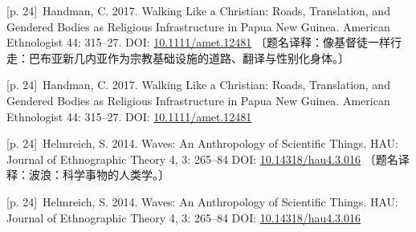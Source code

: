 \documentclass[10pt,a4paper]{article}
\begin{document}
\noindent\begin{minipage}{\textwidth}\begin{minipage}[t]{\dimexpr.5\textwidth-4mm\relax}\noindent\begin{minipage}[t]{\linewidth}{\scriptsize\color{gray} [p. 24]}\ Handman, C. 2017. Walking Like a Christian: Roads, Translation, and Gendered Bodies as Religious Infrastructure in Papua New Guinea. American Ethnologist 44: 315–27. DOI: \url{10.1111/amet.12481} 〔题名译释：像基督徒一样行走：巴布亚新几内亚作为宗教基础设施的道路、翻译与性别化身体。〕\par\end{minipage}\par\end{minipage}\hfill\begin{minipage}[t]{\dimexpr.5\textwidth-4mm\relax}\noindent\begin{minipage}[t]{\linewidth}{\scriptsize\color{gray} [p. 24]}\ Handman, C. 2017. Walking Like a Christian: Roads, Translation, and Gendered Bodies as Religious Infrastructure in Papua New Guinea. American Ethnologist 44: 315–27. DOI: \url{10.1111/amet.12481}\par\end{minipage}\par\end{minipage}\end{minipage}\par
\noindent\begin{minipage}{\textwidth}\begin{minipage}[t]{\dimexpr.5\textwidth-4mm\relax}\noindent\begin{minipage}[t]{\linewidth}{\scriptsize\color{gray} [p. 24]}\ Helmreich, S. 2014. Waves: An Anthropology of Scientific Things. HAU: Journal of Ethnographic Theory 4, 3: 265–84 DOI: \url{10.14318/hau4.3.016} 〔题名译释：波浪：科学事物的人类学。〕\par\end{minipage}\par\end{minipage}\hfill\begin{minipage}[t]{\dimexpr.5\textwidth-4mm\relax}\noindent\begin{minipage}[t]{\linewidth}{\scriptsize\color{gray} [p. 24]}\ Helmreich, S. 2014. Waves: An Anthropology of Scientific Things. HAU: Journal of Ethnographic Theory 4, 3: 265–84 DOI: \url{10.14318/hau4.3.016}\par\end{minipage}\par\end{minipage}\end{minipage}\par
\end{document}

